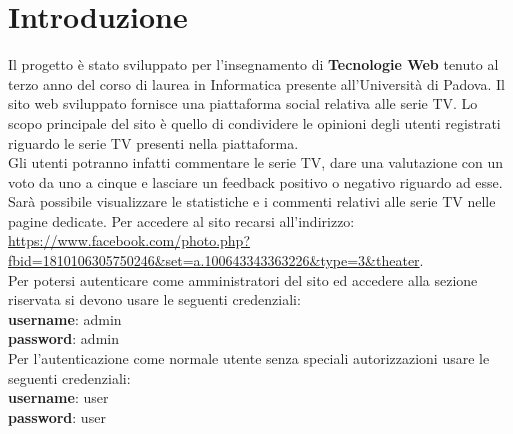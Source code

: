 \newpage
\section{Introduzione}
Il progetto è stato sviluppato per l'insegnamento di \textbf{\normalsize{Tecnologie Web}} tenuto al terzo anno del corso di laurea in Informatica presente all'Università di Padova. Il sito web sviluppato fornisce una piattaforma social relativa alle serie TV. Lo scopo principale del sito è quello di condividere le opinioni degli utenti registrati riguardo le serie TV presenti nella piattaforma.\\
Gli utenti potranno infatti commentare le serie TV, dare una valutazione con un voto da uno a cinque e lasciare un feedback positivo o negativo riguardo ad esse.\\
Sarà possibile visualizzare le statistiche e i commenti relativi alle serie TV nelle pagine dedicate.
Per accedere al sito recarsi all'indirizzo: \url{https://www.facebook.com/photo.php?fbid=1810106305750246&set=a.100643343363226&type=3&theater}.~\\

Per potersi autenticare come amministratori del sito ed accedere 
alla sezione riservata si devono usare le seguenti credenziali: \\
\enspace \textbf{username}: admin\\ 
\enspace \textbf{password}: admin \\

Per l'autenticazione come normale utente senza speciali autorizzazioni usare le seguenti credenziali:\\
\enspace \textbf{username}: user\\ 
\enspace \textbf{password}: user \\
